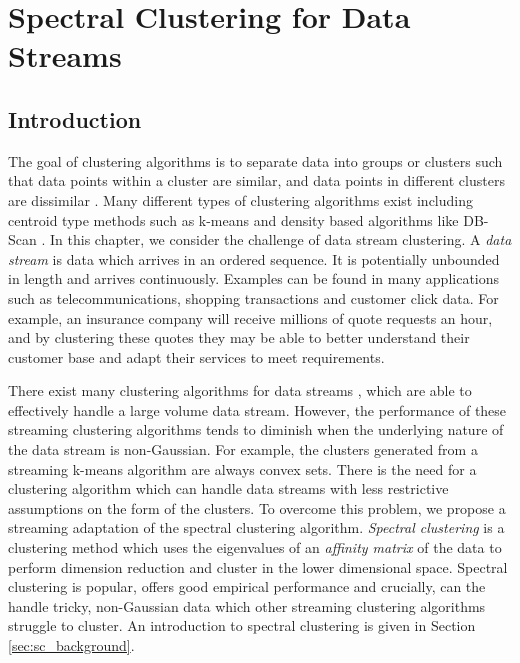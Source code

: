 % 
\graphicspath{{Chapter2/figures/}} 

\chapter{Spectral Clustering for Data Streams}
\label{chap:spectral}
\section{Introduction}
\label{sec:datastreams_intro}

The goal of clustering algorithms is to separate data into groups or clusters such that data points within a cluster are similar, and data points in different clusters are dissimilar \citep{Everitt2001}. Many different types of clustering algorithms exist including centroid type methods such as k-means \citep{MacQueen1967, Lloyd1982} and density based algorithms like DB-Scan \citep{Ester1996}. In this chapter, we consider the challenge of data stream clustering. A \textit{data stream} \citep{Gama2010, Silva2013} is data which arrives in an ordered sequence. It is potentially unbounded in length and arrives continuously. Examples can be found in many applications such as telecommunications, shopping transactions and customer click data. For example, an insurance company will receive millions of quote requests an hour, and by clustering these quotes they may be able to better understand their customer base and adapt their services to meet requirements.

There exist many clustering algorithms for data streams \citep{Yang2013, Maung2013, Song2013}, which are able to effectively handle a large volume data stream. However, the performance of these streaming clustering algorithms tends to diminish when the underlying nature of the data stream is non-Gaussian. For example, the clusters generated from a streaming k-means algorithm are always convex sets. There is the need for a clustering algorithm which can handle data streams with less restrictive assumptions on the form of the clusters. To overcome this problem, we propose a streaming adaptation of the spectral clustering algorithm. \textit{Spectral clustering} \citep{Luxburg2008} is a clustering method which uses the eigenvalues of an \textit{affinity matrix} of the data to perform dimension reduction and cluster in the lower dimensional space. Spectral clustering is popular, offers good empirical performance and crucially, can the handle tricky, non-Gaussian data which other streaming clustering algorithms struggle to cluster. An introduction to spectral clustering is given in Section \ref{sec:sc_background}.

